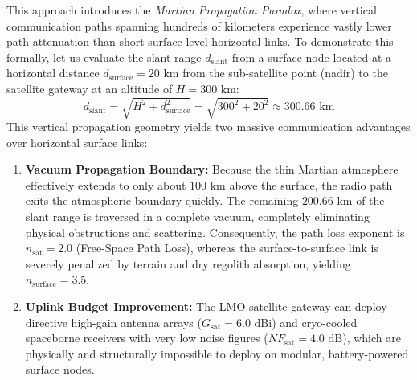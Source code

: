\documentclass[journal,10pt,doublecolumn]{IEEEtran}
\begin{document}
This approach introduces the \textit{Martian Propagation Paradox}, where vertical communication paths spanning hundreds of kilometers experience vastly lower path attenuation than short surface-level horizontal links. To demonstrate this formally, let us evaluate the slant range $d_{\text{slant}}$ from a surface node located at a horizontal distance $d_{\text{surface}} = 20\text{ km}$ from the sub-satellite point (nadir) to the satellite gateway at an altitude of $H = 300\text{ km}$:
\begin{equation}
    d_{\text{slant}} = \sqrt{H^2 + d_{\text{surface}}^2} = \sqrt{300^2 + 20^2} \approx 300.66\text{ km}
\end{equation}
This vertical propagation geometry yields two massive communication advantages over horizontal surface links:
\begin{enumerate}
    \item \textbf{Vacuum Propagation Boundary:} Because the thin Martian atmosphere effectively extends to only about $100\text{ km}$ above the surface, the radio path exits the atmospheric boundary quickly. The remaining $200.66\text{ km}$ of the slant range is traversed in a complete vacuum, completely eliminating physical obstructions and scattering. Consequently, the path loss exponent is $n_{\text{sat}} = 2.0$ (Free-Space Path Loss), whereas the surface-to-surface link is severely penalized by terrain and dry regolith absorption, yielding $n_{\text{surface}} = 3.5$.
    \item \textbf{Uplink Budget Improvement:} The LMO satellite gateway can deploy directive high-gain antenna arrays ($G_{\text{sat}} = 6.0\text{ dBi}$) and cryo-cooled spaceborne receivers with very low noise figures ($NF_{\text{sat}} = 4.0\text{ dB}$), which are physically and structurally impossible to deploy on modular, battery-powered surface nodes.
\end{enumerate}
\end{document}
